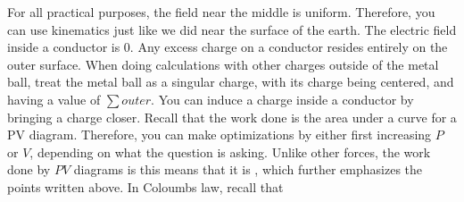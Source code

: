 \markdownRendererUlEnd \markdownRendererInterblockSeparator
{}\markdownRendererInterblockSeparator
{}For all practical purposes, the field near the middle is uniform. Therefore, you can use kinematics just like we did near the surface of the earth.\markdownRendererInterblockSeparator
{}\markdownRendererInterblockSeparator
{}\markdownRendererUlBeginTight
\markdownRendererUlItem The electric field inside a conductor is $0$.\markdownRendererUlItemEnd 
\markdownRendererUlItem Any excess charge on a conductor resides entirely on the outer surface.\markdownRendererUlItemEnd 
\markdownRendererUlItem When doing calculations with other charges outside of the metal ball, treat the metal ball as a singular charge, with its charge being centered, and having a value of $\sum outer$.\markdownRendererUlItemEnd 
\markdownRendererUlItem You can induce a charge inside a conductor by bringing a charge closer.\markdownRendererUlItemEnd 
\markdownRendererUlEndTight \markdownRendererInterblockSeparator
{}\markdownRendererInterblockSeparator
{}\markdownRendererUlBeginTight
\markdownRendererUlItem Recall that the work done is the area under a curve for a PV diagram. Therefore, you can make optimizations by either first increasing $P$ or $V$, depending on what the question is asking.\markdownRendererUlItemEnd 
\markdownRendererUlItem Unlike other forces, the work done by $PV$ diagrams is  this means that it is , which further emphasizes the points written above.\markdownRendererUlItemEnd 
\markdownRendererUlEndTight \markdownRendererInterblockSeparator
{}\markdownRendererInterblockSeparator
{}\markdownRendererInterblockSeparator
{}\markdownRendererUlBeginTight
\markdownRendererUlItem In Coloumbs law, recall that\markdownRendererUlItemEnd 
\markdownRendererUlEndTight \relax